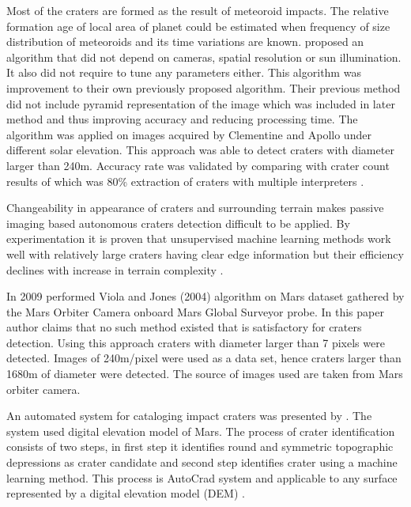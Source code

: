 \documentclass[11pt]{article}
\begin{document}
Most of the craters are formed as the result of meteoroid impacts. The relative formation age of local area of planet could be estimated when frequency of size distribution of meteoroids and its time variations are known. \cite{sawabe_2006} proposed an algorithm that did not depend on cameras, spatial resolution or sun illumination. It also did not require to tune any parameters either. This algorithm was improvement to their own previously proposed algorithm. Their previous method did not include pyramid representation of the image which was included in later method and thus improving accuracy and reducing processing time. The algorithm was applied on images acquired by Clementine and Apollo under different solar elevation. This approach was able to detect craters with diameter larger than 240m. Accuracy rate was validated by comparing with crater count results of \cite{neukum1975cratering} which was 80\% extraction of craters with multiple interpreters \cite{sawabe_2006}. 

Changeability in appearance of craters and surrounding terrain makes passive imaging based autonomous craters detection difficult to be applied. By experimentation it is proven that unsupervised machine learning methods work well with relatively large craters having clear edge information but their efficiency declines with increase in terrain complexity \cite{meng2009method}.

In 2009 \cite{martins2009crater} performed Viola and Jones (2004) algorithm on Mars dataset gathered by the Mars Orbiter Camera onboard Mars Global Surveyor probe. In this paper author claims that no such method existed that is satisfactory for craters detection. Using this approach craters with diameter larger than 7 pixels were detected. Images of 240m/pixel were used as a data set, hence craters larger than 1680m of diameter were detected. The source of images used are taken from Mars orbiter camera.

An automated system for cataloging impact craters was presented by \cite{stepinski2009machine}. The system used digital elevation model of Mars. The process of crater identification consists of two steps, in first step it identifies round and symmetric topographic depressions as crater candidate and second step identifies crater using a machine learning method. This process is AutoCrad system and applicable to any surface represented by a digital elevation model (DEM) \cite{stepinski2009machine}. 
\end{document}
